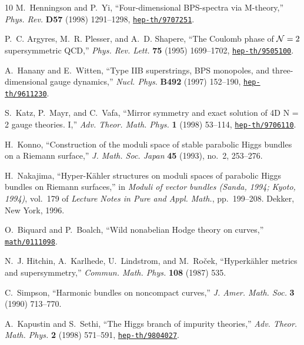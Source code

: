 \begin{thebibliography}{10}
M.~Henningson and P.~Yi, ``{Four-dimensional BPS-spectra via M-theory},'' {\em
  Phys. Rev.} {\bf D57} (1998) 1291--1298,
\href{http://www.arXiv.org/abs/hep-th/9707251}{{\tt hep-th/9707251}}.

P.~C. Argyres, M.~R. Plesser, and A.~D. Shapere, ``{The Coulomb phase of $\mathcal{N}=2$
  supersymmetric QCD},'' {\em Phys. Rev. Lett.} {\bf 75} (1995) 1699--1702,
\href{http://www.arXiv.org/abs/hep-th/9505100}{{\tt hep-th/9505100}}.

A.~Hanany and E.~Witten, ``{Type IIB superstrings, BPS monopoles, and three-
  dimensional gauge dynamics},'' {\em Nucl. Phys.} {\bf B492} (1997) 152--190,
\href{http://www.arXiv.org/abs/hep-th/9611230}{{\tt hep-th/9611230}}.

S.~Katz, P.~Mayr, and C.~Vafa, ``{Mirror symmetry and exact solution of 4D N =
  2 gauge theories. I},'' {\em Adv. Theor. Math. Phys.} {\bf 1} (1998) 53--114,
\href{http://www.arXiv.org/abs/hep-th/9706110}{{\tt hep-th/9706110}}.

H.~Konno, ``Construction of the moduli space of stable parabolic {H}iggs
  bundles on a {R}iemann surface,'' {\em J. Math. Soc. Japan} {\bf 45} (1993),
  no.~2, 253--276.

H.~Nakajima, ``Hyper-{K}\"ahler structures on moduli spaces of parabolic
  {H}iggs bundles on {R}iemann surfaces,'' in {\em Moduli of vector bundles
  ({S}anda, 1994; {K}yoto, 1994)}, vol.~179 of {\em Lecture Notes in Pure and
  Appl. Math.}, pp.~199--208.
\newblock Dekker, New York, 1996.

O.~Biquard and P.~Boalch, ``{W}ild nonabelian {H}odge theory on curves,''
  \href{http://www.arXiv.org/abs/math/0111098}{{\tt math/0111098}}.

N.~J. Hitchin, A.~Karlhede, U.~Lindstrom, and M.~Ro\v{c}ek, ``Hyperk{\"a}hler
  metrics and supersymmetry,'' {\em Commun. Math. Phys.} {\bf 108} (1987)
535.

C.~Simpson, ``{H}armonic bundles on noncompact curves,'' {\em J. Amer. Math.
  Soc.} {\bf 3} (1990) 713--770.

A.~Kapustin and S.~Sethi, ``{The Higgs branch of impurity theories},'' {\em
  Adv. Theor. Math. Phys.} {\bf 2} (1998) 571--591,
\href{http://www.arXiv.org/abs/hep-th/9804027}{{\tt hep-th/9804027}}.


\end{thebibliography}
